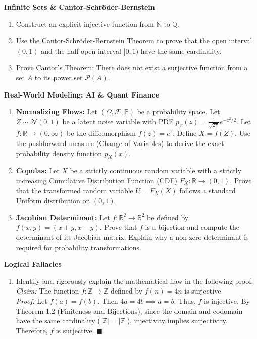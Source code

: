 \documentclass[11pt, letterpaper]{article}
\theoremstyle{definition}
\theoremstyle{remark}
\newcommand{\R}{\mathbb{R}}
\newcommand{\N}{\mathbb{N}}
\newcommand{\Z}{\mathbb{Z}}
\newcommand{\Q}{\mathbb{Q}}
\newcommand{\Prob}{\mathbb{P}}
\newcommand{\F}{\mathcal{F}}
\begin{document}
\textbf{Infinite Sets \& Cantor-Schröder-Bernstein}
\begin{enumerate}[label=\textbf{\arabic*.}, resume]
    \item Construct an explicit injective function from $\N$ to $\Q$.
    \item Use the Cantor-Schröder-Bernstein Theorem to prove that the open interval $(0, 1)$ and the half-open interval $[0, 1)$ have the same cardinality.
    \item Prove Cantor's Theorem: There does not exist a surjective function from a set $A$ to its power set $\mathcal{P}(A)$.
\end{enumerate}

\textbf{Real-World Modeling: AI \& Quant Finance}
\begin{enumerate}[label=\textbf{\arabic*.}, resume]
    \item \textbf{Normalizing Flows:} Let $(\Omega, \F, \Prob)$ be a probability space. Let $Z \sim \mathcal{N}(0, 1)$ be a latent noise variable with PDF $p_Z(z) = \frac{1}{\sqrt{2\pi}} e^{-z^2/2}$. Let $f : \R \to (0, \infty)$ be the diffeomorphism $f(z) = e^z$. Define $X = f(Z)$. Use the pushforward measure (Change of Variables) to derive the exact probability density function $p_X(x)$.
    \item \textbf{Copulas:} Let $X$ be a strictly continuous random variable with a strictly increasing Cumulative Distribution Function (CDF) $F_X : \R \to (0, 1)$. Prove that the transformed random variable $U = F_X(X)$ follows a standard Uniform distribution on $(0, 1)$.
    \item \textbf{Jacobian Determinant:} Let $f : \R^2 \to \R^2$ be defined by $f(x, y) = (x + y, x - y)$. Prove that $f$ is a bijection and compute the determinant of its Jacobian matrix. Explain why a non-zero determinant is required for probability transformations.
\end{enumerate}

\textbf{Logical Fallacies}
\begin{enumerate}[label=\textbf{\arabic*.}, resume]
    \item Identify and rigorously explain the mathematical flaw in the following proof: \\
    \textit{Claim:} The function $f : \Z \to \Z$ defined by $f(n) = 4n$ is surjective. \\
    \textit{Proof:} Let $f(a) = f(b)$. Then $4a = 4b \implies a = b$. Thus, $f$ is injective. By Theorem 1.2 (Finiteness and Bijections), since the domain and codomain have the same cardinality ($|\Z| = |\Z|$), injectivity implies surjectivity. Therefore, $f$ is surjective. $\blacksquare$
\end{enumerate}
\end{document}
